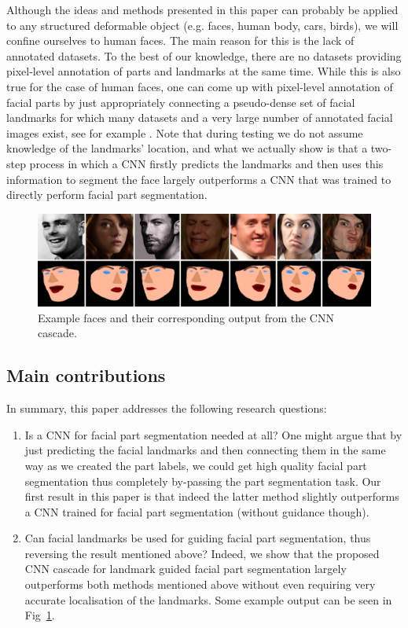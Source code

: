 Although the ideas and methods presented in this paper can probably be
applied to any structured deformable object (e.g. faces, human body,
cars, birds), we will confine ourselves to human faces. The main
reason for this is the lack of annotated datasets. To the best of our
knowledge, there are no datasets providing pixel-level annotation of
parts and landmarks at the same time. While this is also true for the
case of human faces, one can come up with pixel-level annotation of
facial parts by just appropriately connecting a pseudo-dense set of
facial landmarks for which many datasets and a very large number of
annotated facial images exist, see for example
\cite{sagonas2013semi}. Note that during testing we do not assume
knowledge of the landmarks' location, and what we actually show is
that a two-step process in which a CNN firstly predicts the landmarks
and then uses this information to segment the face largely outperforms
a CNN that was trained to directly perform facial part segmentation.

\begin{figure}
\centering
\includegraphics[width=\linewidth]{figs/sampler.png}
\caption[Examples from our facial part segmentation method]{Example
  faces and their corresponding output from the CNN cascade.}
\label{fig:sampler}
\end{figure}


\subsection{Main contributions}

In summary, this paper addresses the following research questions:
\begin{enumerate}
\item Is a CNN for facial part segmentation needed at all? One might
  argue that by just predicting the facial landmarks and then
  connecting them in the same way as we created the part labels, we
  could get high quality facial part segmentation thus completely
  by-passing the part segmentation task. Our first result in this
  paper is that indeed the latter method slightly outperforms a CNN
  trained for facial part segmentation (without guidance though).
\item Can facial landmarks be used for guiding facial part
  segmentation, thus reversing the result mentioned above? Indeed, we
  show that the proposed CNN cascade for landmark guided facial part
  segmentation largely outperforms both methods mentioned above
  without even requiring very accurate localisation of the
  landmarks. Some example output can be seen in Fig~\ref{fig:sampler}.
\end{enumerate}


